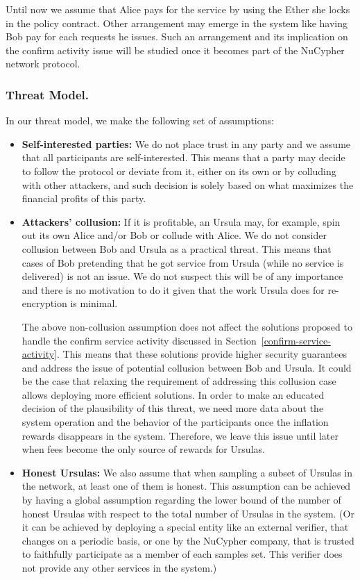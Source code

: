 Until now we assume that Alice pays for the service by using the Ether she locks 
in the policy contract. Other arrangement may emerge in the system like having 
Bob pay for each requests he issues. Such an arrangement and its implication on the 
confirm activity issue will be studied once it becomes part of the NuCypher 
network protocol.


\subsubsection{Threat Model.}
In our threat model, we make the following set of assumptions:
\begin{itemize}
\item {\bf Self-interested parties:} We do not place trust in any party and we assume that all participants are 
self-interested. This means that a party may decide to 
follow the protocol or deviate from it, either on its own or by colluding 
with other attackers, and such decision is solely based on what maximizes the financial profits
of this party.

\item {\bf Attackers' collusion:} If it is profitable, an Ursula may, for example, spin out  
its own Alice and/or Bob or collude with Alice. We do not consider collusion 
between Bob and Ursula as a practical threat. This means that cases of Bob pretending  
that he got service from Ursula (while no service is delivered) is not an issue. We do not 
suspect this will be of any importance and there is no motivation to do it given that 
the work Ursula does for re-encryption is minimal.

The above non-collusion assumption does not affect the solutions proposed to handle 
the confirm service activity discussed in Section~\ref{confirm-service-activity}. This 
means that these solutions provide higher 
security guarantees and address the issue of potential collusion between Bob and Ursula. 
It could be the case that relaxing the requirement of 
addressing this collusion case allows deploying more efficient solutions. 
In order to make an educated decision of the plausibility of this threat, we need 
more data about the system operation and the behavior of the participants 
once the inflation rewards disappears in the system. Therefore, we leave this 
issue until later when fees become the only source of rewards for Ursulas.

\item {\bf Honest Ursulas:} We also assume that when sampling a subset of Ursulas in the network, 
at least one of them is honest. This assumption can be achieved by 
having a global assumption regarding the lower bound of the number of 
honest Ursulas with respect to the total number of Ursulas in the system. 
(Or it can be achieved by deploying a special entity like an external verifier, 
that changes on a periodic basis, or one by the NuCypher company, that is
trusted to faithfully participate as a member of each samples set. This 
verifier does not provide any other services 
in the system.)
\end{itemize}


